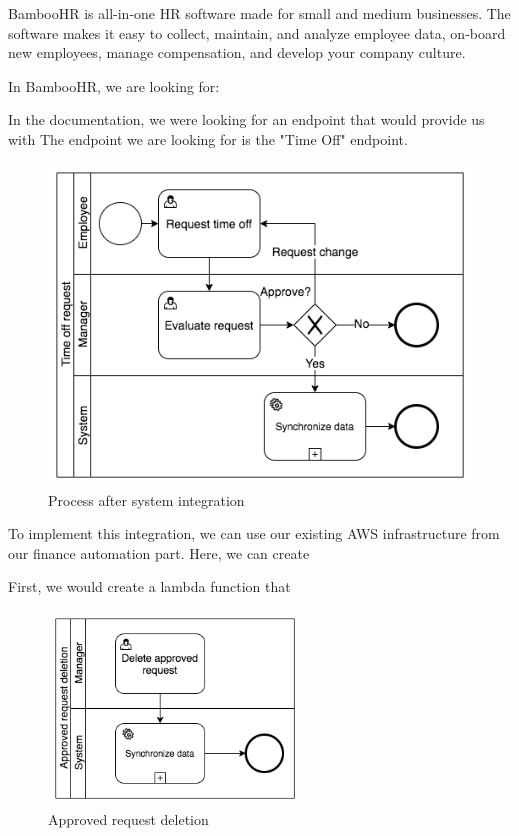 \documentclass[12pt,oneside]{fithesis2}
\begin{document}
BambooHR is all-in-one HR software made for small and medium businesses. The software makes it easy to collect, maintain, and analyze employee data, on-board new employees, manage compensation, and develop your company culture.\cite{bambooHR}



In BambooHR, we are looking for: 

In the documentation, we were looking for an endpoint that would provide us with 
The endpoint we are looking for is the "Time Off" endpoint.


\begin{figure}[H]
    \centering
    \includegraphics[width=\textwidth]{after_sys_integration.png}
    \caption{Process after system integration}
    \label{fig:after_sys_integration}
\end{figure}

To implement this integration, we can use our existing AWS infrastructure from our finance automation part. Here, we can create 

First, we would create a lambda function that 

\begin{figure}[H]
    \centering
    \includegraphics[width=0.6\textwidth]{delete_approved.png}
    \caption{Approved request deletion}
    \label{fig:delete_approved}
\end{figure}
\end{document}
